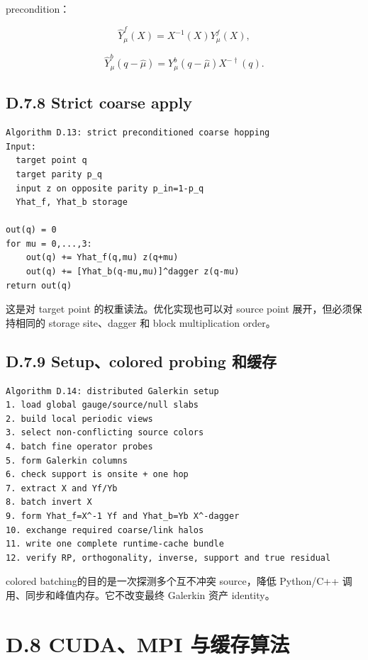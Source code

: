 \documentclass[UTF8,a4paper,10pt]{ctexart}
\begin{document}
precondition：

\begin{displaymath}
\widehat Y_\mu^f(X)=X^{-1}(X)Y_\mu^f(X),
\end{displaymath}

\begin{displaymath}
\widehat Y_\mu^b(q-\hat\mu) =Y_\mu^b(q-\hat\mu)X^{-\dagger}(q).
\end{displaymath}

\subsection{D.7.8 Strict coarse apply}
\begin{Verbatim}[breaklines=true,breakanywhere=true,fontsize=\scriptsize]
Algorithm D.13: strict preconditioned coarse hopping
Input:
  target point q
  target parity p_q
  input z on opposite parity p_in=1-p_q
  Yhat_f, Yhat_b storage

out(q) = 0
for mu = 0,...,3:
    out(q) += Yhat_f(q,mu) z(q+mu)
    out(q) += [Yhat_b(q-mu,mu)]^dagger z(q-mu)
return out(q)
\end{Verbatim}
这是对 target point 的权重读法。优化实现也可以对 source point 展开，但必须保持相同的 storage site、dagger 和 block multiplication order。

\subsection{D.7.9 Setup、colored probing 和缓存}
\begin{Verbatim}[breaklines=true,breakanywhere=true,fontsize=\scriptsize]
Algorithm D.14: distributed Galerkin setup
1. load global gauge/source/null slabs
2. build local periodic views
3. select non-conflicting source colors
4. batch fine operator probes
5. form Galerkin columns
6. check support is onsite + one hop
7. extract X and Yf/Yb
8. batch invert X
9. form Yhat_f=X^-1 Yf and Yhat_b=Yb X^-dagger
10. exchange required coarse/link halos
11. write one complete runtime-cache bundle
12. verify RP, orthogonality, inverse, support and true residual
\end{Verbatim}
colored batching的目的是一次探测多个互不冲突 source，降低 Python/C++ 调用、同步和峰值内存。它不改变最终 Galerkin 资产 identity。

\section{D.8 CUDA、MPI 与缓存算法}
\end{document}
